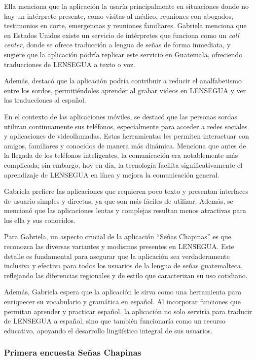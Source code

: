 Ella menciona que la aplicación la usaría principalmente en situaciones donde no hay un intérprete presente, como visitas al médico, reuniones con abogados, testimonios en corte, emergencias y reuniones familiares. Gabriela menciona que en Estados Unidos existe un servicio de intérpretes que funciona como un \textit{call center}, donde se ofrece traducción a lengua de señas de forma inmediata, y sugiere que la aplicación podría replicar este servicio en Guatemala, ofreciendo traducciones de LENSEGUA a texto o voz.

Además, destacó que la aplicación podría contribuir a reducir el analfabetismo entre los sordos, permitiéndoles aprender al grabar videos en LENSEGUA y ver las traducciones al español. 

En el contexto de las aplicaciones móviles, se destacó que las personas sordas utilizan continuamente sus teléfonos, especialmente para acceder a redes sociales y aplicaciones de videollamadas. Estas herramientas les permiten interactuar con amigos, familiares y conocidos de manera más dinámica. Menciona que antes de la llegada de los teléfonos inteligentes, la comunicación era notablemente más complicada; sin embargo, hoy en día, la tecnología facilita significativamente el aprendizaje de LENSEGUA en línea y mejora la comunicación general. 

Gabriela prefiere las aplicaciones que requieren poco texto y presentan interfaces de usuario simples y directas, ya que son más fáciles de utilizar. Además, se mencionó que las aplicaciones lentas y complejas resultan menos atractivas para los ella y sus conocidos.

Para Gabriela, un aspecto crucial de la aplicación ``Señas Chapinas'' es que reconozca las diversas variantes y modismos presentes en LENSEGUA. Este detalle es fundamental para asegurar que la aplicación sea verdaderamente inclusiva y efectiva para todos los usuarios de la lengua de señas guatemalteca, reflejando las diferencias regionales y de estilo que caracterizan su uso cotidiano.

Además, Gabriela espera que la aplicación le sirva como una herramienta para enriquecer su vocabulario y gramática en español. Al incorporar funciones que permitan aprender y practicar español, la aplicación no solo serviría para traducir de LENSEGUA a español, sino que también funcionaría como un recurso educativo, apoyando el desarrollo lingüístico integral de sus usuarios.


\subsubsection{Primera encuesta Señas Chapinas}

